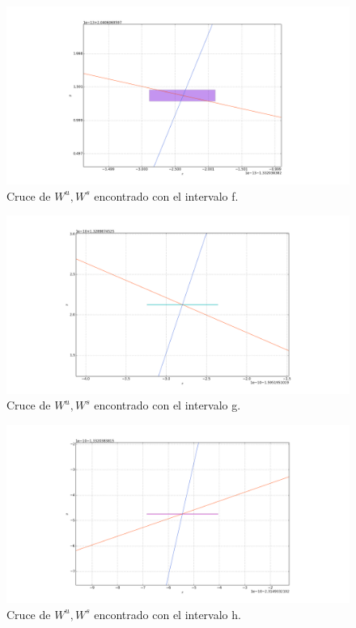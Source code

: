 \begin{figure}[H]
\centering
\includegraphics[scale=0.4]{cruce6}
\caption{Cruce de $W^{u},W^{s}$ encontrado con el intervalo f.}
\label{cruce6H}
\end{figure}

\begin{figure}[H]
\centering
\includegraphics[scale=0.4]{cruce7}
\caption{Cruce de $W^{u},W^{s}$ encontrado con el intervalo g.}
\label{cruce7H}
\end{figure}

\begin{figure}[H]
\centering
\includegraphics[scale=0.4]{cruce8}
\caption{Cruce de $W^{u},W^{s}$ encontrado con el intervalo h.}
\label{cruce8H}
\end{figure}

